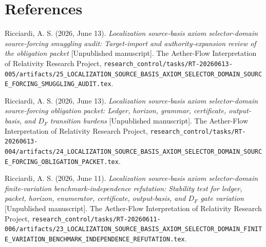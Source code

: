 \documentclass[11pt]{article}
\begin{document}
\section*{References}

Ricciardi, A. S. (2026, June 13). \emph{Localization source-basis axiom
selector-domain source-forcing smuggling audit: Target-import and
authority-expansion review of the obligation packet} [Unpublished
manuscript]. The Aether-Flow Interpretation of Relativity Research Project,
\texttt{research\_control/tasks/RT-20260613-005/artifacts/25\_LOCALIZATION\_SOURCE\_BASIS\_AXIOM\_SELECTOR\_DOMAIN\_SOURCE\_FORCING\_SMUGGLING\_AUDIT.tex}.

Ricciardi, A. S. (2026, June 13). \emph{Localization source-basis axiom
selector-domain source-forcing obligation packet: Ledger, horizon, grammar,
certificate, output-basis, and \(D_F\) transition burdens} [Unpublished
manuscript]. The Aether-Flow Interpretation of Relativity Research Project,
\texttt{research\_control/tasks/RT-20260613-004/artifacts/24\_LOCALIZATION\_SOURCE\_BASIS\_AXIOM\_SELECTOR\_DOMAIN\_SOURCE\_FORCING\_OBLIGATION\_PACKET.tex}.

Ricciardi, A. S. (2026, June 11). \emph{Localization source-basis axiom
selector-domain finite-variation benchmark-independence refutation:
Stability test for ledger, packet, horizon, enumerator, certificate,
output-basis, and \(D_F\) gate variation} [Unpublished manuscript]. The
Aether-Flow Interpretation of Relativity Research Project,
\texttt{research\_control/tasks/RT-20260611-006/artifacts/23\_LOCALIZATION\_SOURCE\_BASIS\_AXIOM\_SELECTOR\_DOMAIN\_FINITE\_VARIATION\_BENCHMARK\_INDEPENDENCE\_REFUTATION.tex}.
\end{document}
